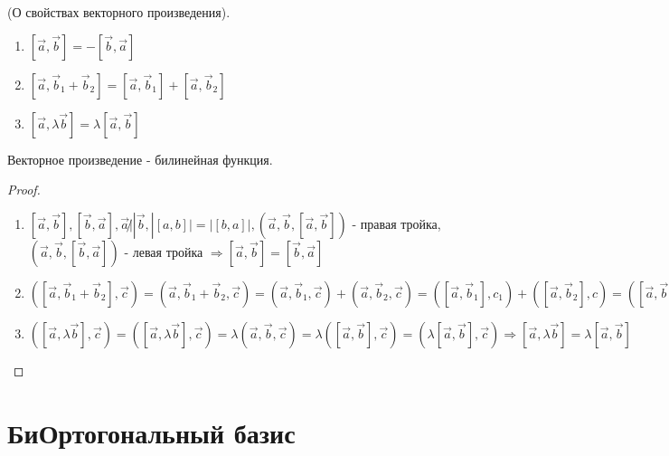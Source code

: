 \begin{theorem}
	(О свойствах векторного произведения). 
	\begin{enumerate}
		\item  \([\vec a, \vec b] = - [\vec b, \vec a]\)
		\item \([\vec a, \vec b_1 + \vec b_2] = [\vec a, \vec b_1] + [\vec a, \vec b_2]\)
		\item \([\vec a, \lambda\vec b] = \lambda [\vec a, \vec b]\)
	\end{enumerate}
\end{theorem}
\begin{note}
	Векторное произведение - билинейная функция.
\end{note}
\begin{proof}
	\begin{enumerate}
		\item \([\vec a, \vec b], [\vec b, \vec a], \vec a \not||\vec b, |[a, b]| = |[b, a]|, (\vec a, \vec b, [\vec a, \vec b])\) - правая тройка, \((\vec a, \vec b, [\vec b, \vec a])\) - левая тройка $\Longrightarrow [\vec a, \vec b] = [\vec b, \vec a]$
		\item \(([\vec a, \vec b_1 + \vec b_2], \vec c) = (\vec a, \vec b_1 + \vec b_2, \vec c) = (\vec a, \vec b_1, \vec c) + (\vec a, \vec b_2, \vec c) = ([\vec a, \vec b_1], c_1) + ([\vec{a}, \vec b_2], c) = ([\vec a, \vec b_1] + [\vec a, \vec b_2], c) \Longrightarrow [\vec a, \vec b_1 + \vec b_2] = [\vec a, \vec b_1] + [\vec a, \vec b_2]\)
		\item \(([\vec a, \lambda \vec b], \vec c) = ([\vec a, \lambda\vec b], \vec c) = \lambda (\vec a, \vec b, \vec c) = \lambda ([\vec a, \vec b], \vec c) = (\lambda [\vec a, \vec b], \vec c) \Longrightarrow [\vec a, \lambda \vec b] = \lambda [\vec a, \vec b]\)
	\end{enumerate}
\end{proof}
\section{БиОртогональный базис}

